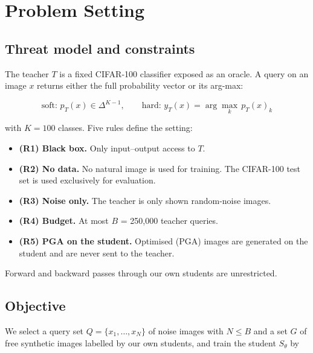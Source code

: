 \documentclass[
  10pt,
]{article}
\providecommand{\tightlist}{%
  \setlength{\itemsep}{0pt}\setlength{\parskip}{0pt}}
\begin{document}
\hypertarget{problem-setting}{%
\section{Problem Setting}\label{problem-setting}}

\hypertarget{threat-model-and-constraints}{%
\subsection{Threat model and
constraints}\label{threat-model-and-constraints}}

The teacher \(T\) is a fixed CIFAR-100 classifier exposed as an oracle.
A query on an image \(x\) returns either the full probability vector or
its arg-max:

\begin{equation}\text{soft: } p_T(x)\in\Delta^{K-1}, \qquad \text{hard: } y_T(x)=\arg\max_{k}\, p_T(x)_k \label{eq:1}\end{equation}

with \(K=100\) classes. Five rules define the setting:

\begin{itemize}
\tightlist
\item
  \textbf{(R1) Black box.} Only input--output access to \(T\).
\item
  \textbf{(R2) No data.} No natural image is used for training. The
  CIFAR-100 test set is used exclusively for evaluation.
\item
  \textbf{(R3) Noise only.} The teacher is only shown random-noise
  images.
\item
  \textbf{(R4) Budget.} At most \(B\) = 250,000 teacher queries.
\item
  \textbf{(R5) PGA on the student.} Optimised (PGA) images are generated
  on the student and are never sent to the teacher.
\end{itemize}

Forward and backward passes through our own students are unrestricted.

\hypertarget{objective}{%
\subsection{Objective}\label{objective}}

We select a query set \(Q=\{x_1,\dots,x_N\}\) of noise images with
\(N\le B\) and a set \(G\) of free synthetic images labelled by our own
students, and train the student \(S_\theta\) by
\end{document}
